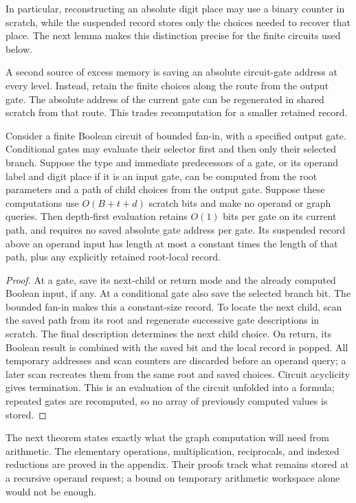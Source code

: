 In particular, reconstructing an absolute digit place may use a binary
counter in scratch, while the suspended record stores only the choices
needed to recover that place.  The next lemma makes this distinction
precise for the finite circuits used below.

A second source of excess memory is saving an absolute circuit-gate address at every level. Instead, retain the finite choices along the route from the output gate. The absolute address of the current gate can be regenerated in shared scratch from that route. This trades recomputation for a smaller retained record.

\begin{lemma}
\label{lem:arith-gate-evaluation}
Consider a finite Boolean circuit of bounded fan-in, with a specified
output gate.  Conditional gates may evaluate their selector first and
then only their selected branch.  Suppose the type and immediate predecessors of a gate,
or its operand label and digit place if it is an input gate, can be
computed from the root parameters and a path of child choices from
the output gate.  Suppose these computations use $O(B+t+d)$ scratch
bits and make no operand or graph queries.  Then depth-first
evaluation retains $O(1)$ bits per gate on its current path, and
requires no saved absolute gate address per gate.  Its suspended
record above an operand input has length at most a constant times
the length of that path, plus any explicitly retained root-local
record.
\end{lemma}

\begin{proof}
At a gate, save its next-child or return mode and the already computed
Boolean input, if any.  At a conditional gate also save the selected
branch bit.  The bounded fan-in makes this a constant-size
record.  To locate the next child, scan the saved path from its root
and regenerate successive gate descriptions in scratch.  The final
description determines the next child choice.  On return, its Boolean
result is combined with the saved bit and the local record is popped.
All temporary addresses and scan counters are discarded before an
operand query; a later scan recreates them from the same root and
saved choices.  Circuit acyclicity gives termination.  This is an
evaluation of the circuit unfolded into a formula; repeated gates are
recomputed, so no array of previously computed values is stored.
\end{proof}


The next theorem states exactly what the graph computation will need from arithmetic. The elementary operations, multiplication, reciprocals, and indexed reductions are proved in the appendix. Their proofs track what remains stored at a recursive operand request; a bound on temporary arithmetic workspace alone would not be enough.

